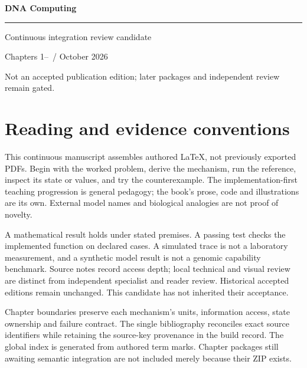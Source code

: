 \documentclass[11pt,oneside,openany]{book}
\begin{document}
\frontmatter
\begin{titlepage}
\color{Blue}\sffamily\vspace*{24mm}
{\Huge\bfseries DNA Computing\par}
\vspace{12mm}{\Large Molecular mechanisms, algorithms and evidence\par}
\vspace{14mm}\rule{\linewidth}{.8pt}\par
\vspace{7mm}{\large Define the mechanism. Derive the result. Test the claim.\par}
\vfill Continuous integration review candidate\par
Chapters 1--\IncludedThrough\ / October 2026\par
Not an accepted publication edition; later packages and independent review remain gated.
\end{titlepage}
\chapter*{Reading and evidence conventions}
This continuous manuscript assembles authored LaTeX, not previously exported PDFs.
Begin with the worked problem, derive the mechanism, run the reference, inspect
its state or values, and try the counterexample. The implementation-first
teaching progression is general pedagogy; the book's prose, code and illustrations
are its own. External model names and biological analogies are not proof of novelty.

A mathematical result holds under stated premises. A passing test checks the
implemented function on declared cases. A simulated trace is not a laboratory
measurement, and a synthetic model result is not a genomic capability benchmark.
Source notes record access depth; local technical and visual review are distinct
from independent specialist and reader review. Historical accepted editions
remain unchanged. This candidate has not inherited their acceptance.

Chapter boundaries preserve each mechanism's units, information access, state
ownership and failure contract. The single bibliography reconciles exact source
identifiers while retaining the source-key provenance in the build record.
The global index is generated from authored term marks. Chapter packages still
awaiting semantic integration are not included merely because their ZIP exists.
\tableofcontents
\mainmatter

\backmatter


\clearpage{}
\printindex
\end{document}
